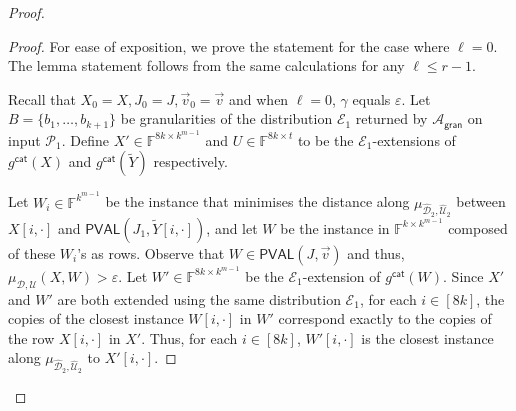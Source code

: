 \documentclass[11pt]{article}
\newcommand{\PVAL}{\mathsf{PVAL}}
\newcommand{\gran}{\mathsf{gran}}
\newcommand{\F}{\mathbb{F}}
\newcommand{\sU}{\mathcal{U}}
\newcommand{\sD}{\mathcal{D}}
\newcommand{\sA}{\mathcal{A}}
\newcommand{\sP}{\mathcal{P}}
\begin{document}
\begin{proof}
\begin{proof}
    For ease of exposition, we prove the statement for the case where $\ell = 0$. The lemma statement follows from the same calculations for any $\ell \leq r-1$. 
    
    Recall that $X_0 = X, J_0 = J, \Vec{v}_0 = \Vec{v}$ and when $\ell=0$, $\gamma$ equals $\varepsilon$. Let $B = \{b_1, \dots, b_{k+1}\}$ be granularities of the distribution $\mathcal{E}_1$ returned by $\sA_\gran$ on input $\sP_1$. Define $X' \in \F^{8k \times k^{m-1}}$ and $U \in \F^{8k \times t}$ to be the $\mathcal{E}_1$-extensions of $g^{\mathsf{cat}}(X)$ and $g^{\mathsf{cat}}(\widetilde{Y})$ respectively. 
    
    Let $W_i \in \F^{k^{m-1}}$ be the instance that minimises the distance along $\mu_{\widehat{\sD}_{2}, \widehat{\sU}_{2}}$ between $X[i,\cdot]$ and $\PVAL(J_{1}, \widetilde{Y}[i,\cdot])$, and let $W$ be the instance in $\F^{k \times k^{m-1}}$ composed of these $W_i$'s as rows. Observe that $W \in \PVAL(J,\Vec{v})$ and thus, $\mu_{\sD, \sU}(X,W) > \varepsilon$. Let $W' \in \F^{8k \times k^{m-1}}$ be the $\mathcal{E}_1$-extension of $g^\mathsf{cat}(W)$. Since $X'$ and $W'$ are both extended using the same distribution $\mathcal{E}_1$, for each $i \in [8k]$, the copies of the closest instance $W[i,\cdot]$ in $W'$ correspond exactly to the copies of the row $X[i,\cdot]$ in $X'$. Thus, for each $i \in [8k]$, $W'[i,\cdot]$ is the closest instance along $\mu_{\widehat{\sD}_{2}, \widehat{\sU}_{2}}$ to $X'[i,\cdot]$. 
   

\end{proof}
\end{proof}
\end{document}
